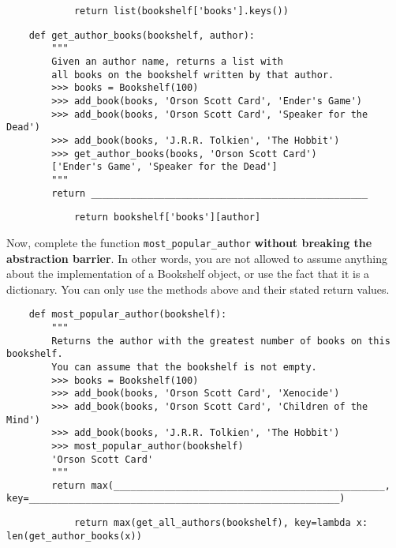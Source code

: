     \begin{solution}[1in]
        \begin{lstlisting}
            return list(bookshelf['books'].keys())
        \end{lstlisting}
    \end{solution}

    \begin{lstlisting}
    def get_author_books(bookshelf, author):
        """
        Given an author name, returns a list with
        all books on the bookshelf written by that author.
        >>> books = Bookshelf(100)
        >>> add_book(books, 'Orson Scott Card', 'Ender's Game')
        >>> add_book(books, 'Orson Scott Card', 'Speaker for the Dead')
        >>> add_book(books, 'J.R.R. Tolkien', 'The Hobbit')
        >>> get_author_books(books, 'Orson Scott Card')
        ['Ender's Game', 'Speaker for the Dead']
        """
        return _________________________________________________
    \end{lstlisting}

    \begin{solution}[1in]
        \begin{lstlisting}
            return bookshelf['books'][author] 
        \end{lstlisting}
    \end{solution}

    \newpage
    Now, complete the function \lstinline{most_popular_author} \textbf{without breaking the abstraction barrier}.
    In other words, you are not allowed to assume anything about the implementation of a Bookshelf object, or
    use the fact that it is a dictionary. You can only use the methods above and their stated return values.

    \begin{lstlisting}
    def most_popular_author(bookshelf):
        """
        Returns the author with the greatest number of books on this bookshelf.
        You can assume that the bookshelf is not empty.
        >>> books = Bookshelf(100)
        >>> add_book(books, 'Orson Scott Card', 'Xenocide')
        >>> add_book(books, 'Orson Scott Card', 'Children of the Mind')
        >>> add_book(books, 'J.R.R. Tolkien', 'The Hobbit')
        >>> most_popular_author(bookshelf)
        'Orson Scott Card'
        """
        return max(________________________________________________, key=_______________________________________________________)
    \end{lstlisting}


    \begin{solution}[1in]
        \begin{lstlisting}
            return max(get_all_authors(bookshelf), key=lambda x: len(get_author_books(x))
        \end{lstlisting}
    \end{solution}



